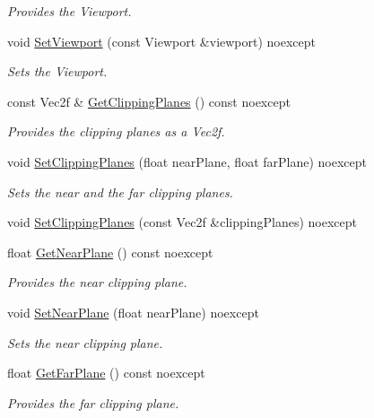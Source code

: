 \begin{DoxyCompactItemize}
\begin{DoxyCompactList}\small\item\em Provides the Viewport. \end{DoxyCompactList}\item 
void \hyperlink{class_blade_1_1_camera_component_a9270ae358568b454a760dccaafc1d0c1}{Set\+Viewport} (const Viewport \&viewport) noexcept
\begin{DoxyCompactList}\small\item\em Sets the Viewport. \end{DoxyCompactList}\item 
const Vec2f \& \hyperlink{class_blade_1_1_camera_component_a2eac5f51fbae88dd50ee1077777088c3}{Get\+Clipping\+Planes} () const noexcept
\begin{DoxyCompactList}\small\item\em Provides the clipping planes as a Vec2f. \end{DoxyCompactList}\item 
void \hyperlink{class_blade_1_1_camera_component_aee047bbc83b264db1cea4ebd6445495b}{Set\+Clipping\+Planes} (float near\+Plane, float far\+Plane) noexcept
\begin{DoxyCompactList}\small\item\em Sets the near and the far clipping planes. \end{DoxyCompactList}\item 
void \hyperlink{class_blade_1_1_camera_component_a30416422c87afed3e80a26b14215948f}{Set\+Clipping\+Planes} (const Vec2f \&clipping\+Planes) noexcept
\item 
float \hyperlink{class_blade_1_1_camera_component_a2c1a4dd439d7c27c37e0a15146fe976f}{Get\+Near\+Plane} () const noexcept
\begin{DoxyCompactList}\small\item\em Provides the near clipping plane. \end{DoxyCompactList}\item 
void \hyperlink{class_blade_1_1_camera_component_a808877ff7c5af8c68f900d44ab2e554b}{Set\+Near\+Plane} (float near\+Plane) noexcept
\begin{DoxyCompactList}\small\item\em Sets the near clipping plane. \end{DoxyCompactList}\item 
float \hyperlink{class_blade_1_1_camera_component_ae7f0621c1db163ee530c75775829401b}{Get\+Far\+Plane} () const noexcept
\begin{DoxyCompactList}\small\item\em Provides the far clipping plane. \end{DoxyCompactList}\item 

\end{DoxyCompactItemize}
